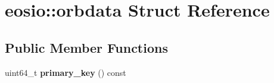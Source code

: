 \hypertarget{structeosio_1_1orbdata}{}\section{eosio\+:\+:orbdata Struct Reference}
\label{structeosio_1_1orbdata}
\subsection*{Public Member Functions}
\begin{DoxyCompactItemize}
\item 
\mbox{\label{structeosio_1_1orbdata_a1cd99aaca629ae99eea3172e24f077fa}} 
uint64\+\_\+t {\bfseries primary\+\_\+key} () const
\end{DoxyCompactItemize}
